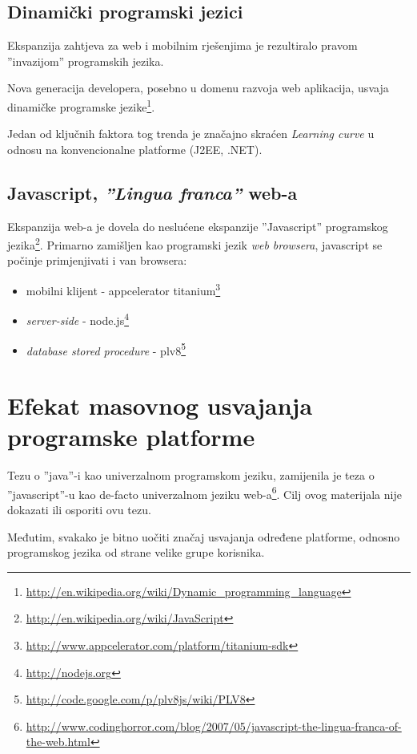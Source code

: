 \documentclass[times, utf8, seminar]{fit}
\begin{document}
\subsection{Dinamički programski jezici}
\label{sec:dynlang}
Ekspanzija zahtjeva za web i mobilnim rješenjima je rezultiralo pravom ''invazijom'' programskih jezika. 

Nova generacija developera, posebno u domenu razvoja web aplikacija, usvaja dinamičke programske jezike\footnote{\url{http://en.wikipedia.org/wiki/Dynamic_programming_language}}. 
 
Jedan od ključnih faktora tog trenda je značajno skraćen \emph{Learning curve} u odnosu na konvencionalne platforme (J2EE, .NET).

\subsection{Javascript, \emph{''Lingua franca''} web-a}
\label{sec:jslang}

Ekspanzija web-a je dovela do neslućene ekspanzije ''Javascript'' programskog jezika\footnote{\url{http://en.wikipedia.org/wiki/JavaScript}}. Primarno zamišljen kao programski jezik \emph{web browsera}, javascript se počinje primjenjivati i van browsera:
\begin{itemize}
  \item mobilni klijent - appcelerator titanium\footnote{\url{http://www.appcelerator.com/platform/titanium-sdk}}
  \item \emph{server-side} - node.js\footnote{\url{http://nodejs.org}}
  \item \emph{database stored procedure} - plv8\footnote{\url{http://code.google.com/p/plv8js/wiki/PLV8}}
\end{itemize}
 

\section{Efekat masovnog usvajanja programske platforme}

Tezu o ''java''-i kao univerzalnom programskom jeziku, zamijenila je teza o ''javascript''-u kao de-facto univerzalnom jeziku web-a\footnote{\url{http://www.codinghorror.com/blog/2007/05/javascript-the-lingua-franca-of-the-web.html}}. Cilj ovog materijala nije dokazati ili osporiti ovu tezu.

Međutim, svakako je bitno uočiti značaj usvajanja određene platforme, odnosno programskog jezika od strane velike grupe korisnika. 
\end{document}

